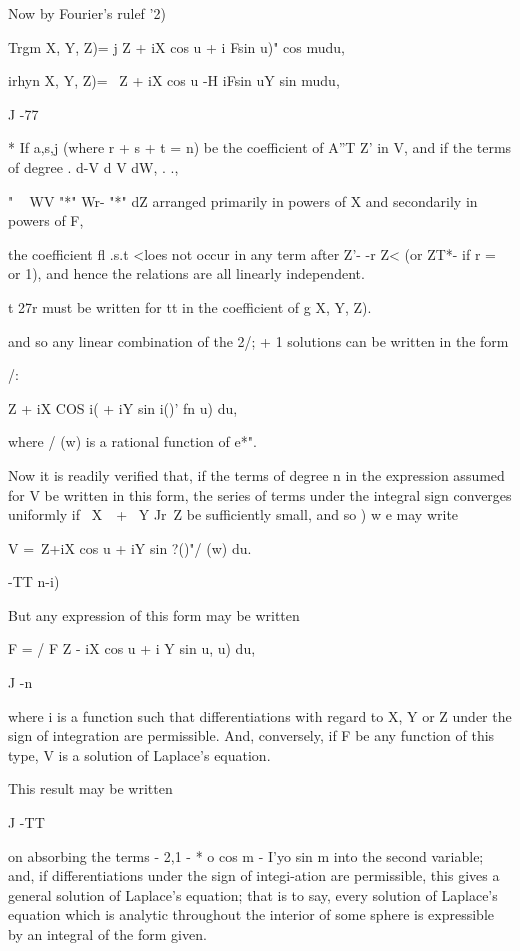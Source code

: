 Now by Fourier's rulef '2)

Trgm X, Y, Z)= j Z + iX cos u + i Fsin u)" cos mudu,

irhyn X, Y, Z)= \ Z + iX cos u -H iFsin uY sin mudu,

J -77

* If a,s,j (where r + s + t = n) be the coefficient of A''T Z' in V,
and if the terms of degree . d-V d V dW, . .,

" ~ WV "*" Wr- "*" dZ arranged primarily in powers of X and
secondarily in powers of F,

the coefficient fl .s.t <loes not occur in any term after Z'- -r Z<
(or ZT*- if r = or 1), and hence the relations are all linearly
independent.

t 27r must be written for tt in the coefficient of g X, Y, Z).

%
%

and so any linear combination of the 2/; + 1 solutions can be written
in the form

/:

 Z + iX COS i( + iY sin i()' fn u) du,

where / (w) is a rational function of e*".

Now it is readily verified that, if the terms of degree n in the
expression assumed for V be written in this form, the series of terms
under the integral sign converges uniformly if \ X\ \ + \ Y Jr\ Z be
sufficiently small, and so ) w e may write

V =\ Z+iX cos u + iY sin ?()"/ (w) du.

 -TT n-i)

But any expression of this form may be written

F = / F Z - iX cos u + i Y sin u, u) du,

J -n

where i is a function such that differentiations with regard to X, Y
or Z under the sign of integration are permissible. And, conversely,
if F be any function of this type, V is a solution of Laplace's
equation.

This result may be written

J -TT

on absorbing the terms - 2,1 - * o cos m - I'yo sin m into the second
variable; and, if differentiations under the sign of integi-ation are
permissible, this gives a general solution of Laplace's equation;
that is to say, every solution of Laplace's equation which is analytic
throughout the interior of some sphere is expressible by an integral
of the form given.

